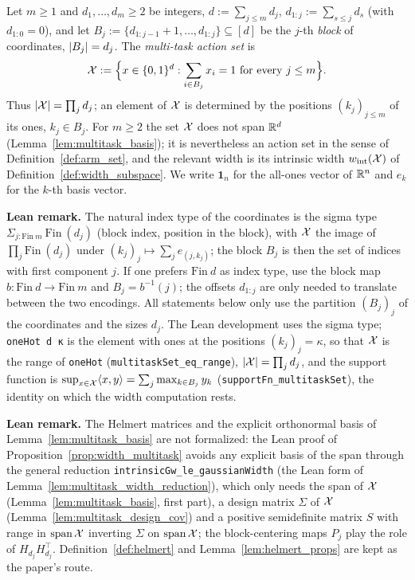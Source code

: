\begin{definition}\label{def:multitask_set}
\leanok
{}
Let $m \ge 1$ and $d_1,\dots,d_m \ge 2$ be integers, $d := \sum_{j\le m} d_j$,
$d_{1:j} := \sum_{s\le j}d_s$ (with $d_{1:0} = 0$), and let
$B_j := \{d_{1:j-1}+1, \dots, d_{1:j}\} \subseteq [d]$ be the $j$-th \emph{block} of
coordinates, $\lvert B_j \rvert = d_j$. The \emph{multi-task action set} is
\[
  \mathcal{X} := \Big\{x \in \{0,1\}^d : \sum_{i\in B_j}x_i = 1 \text{ for every } j \le m\Big\}.
\]
Thus $\lvert \mathcal{X} \rvert = \prod_j d_j$; an element of $\mathcal{X}$ is determined by the positions
$(k_j)_{j\le m}$ of its ones, $k_j \in B_j$. For $m \ge 2$ the set $\mathcal{X}$ does not span $\mathbb{R}^d$
(Lemma~\ref{lem:multitask_basis}); it is nevertheless an action set in the sense of
Definition~\ref{def:arm_set}, and the relevant width is its intrinsic width
$w_{\mathrm{int}}(\mathcal{X})$ of Definition~\ref{def:width_subspace}.
We write $\mathbf 1_n$ for the all-ones vector of $\mathbb{R}^n$ and $e_k$ for the $k$-th basis vector.
\end{definition}

\textbf{Lean remark.} The natural index type of the coordinates is the sigma type
$\Sigma_{j : \mathrm{Fin}\ m}\ \mathrm{Fin}\ (d_j)$ (block index, position in the block), with
$\mathcal{X}$ the image of $\prod_{j}\mathrm{Fin}\ (d_j)$ under
$(k_j)_j \mapsto \sum_j e_{(j,k_j)}$; the block $B_j$ is then the set of indices with first
component $j$. If one prefers $\mathrm{Fin}\ d$ as index type, use the block map
$b : \mathrm{Fin}\ d \to \mathrm{Fin}\ m$ and $B_j = b^{-1}(j)$; the offsets $d_{1:j}$ are
only needed to translate between the two encodings. All statements below only use the
partition $(B_j)_j$ of the coordinates and the sizes $d_j$. The Lean development uses the sigma
type; \texttt{oneHot d κ} is the element with ones at the positions $(k_j)_j = \kappa$, so that
$\mathcal{X}$ is the range of \texttt{oneHot} (\texttt{multitaskSet\_eq\_range}), $\lvert \mathcal{X} \rvert = \prod_j d_j$,
and the support function is $\sup_{x\in\mathcal{X}}\langle x, y \rangle = \sum_j\max_{k\in B_j}y_k$
(\texttt{supportFn\_multitaskSet}), the identity on which the width computation rests.

\textbf{Lean remark.} The Helmert matrices and the explicit orthonormal basis of
Lemma~\ref{lem:multitask_basis} are not formalized: the Lean proof of
Proposition~\ref{prop:width_multitask} avoids any explicit basis of the span through the
general reduction \texttt{intrinsicGw\_le\_gaussianWidth} (the Lean form of
Lemma~\ref{lem:multitask_width_reduction}), which only needs the span of $\mathcal{X}$
(Lemma~\ref{lem:multitask_basis}, first part), a design matrix $\Sigma$ of $\mathcal{X}$
(Lemma~\ref{lem:multitask_design_cov}) and a positive semidefinite matrix $S$ with range in
$\operatorname{span}\mathcal{X}$ inverting $\Sigma$ on $\operatorname{span}\mathcal{X}$; the block-centering maps $P_j$ play the role
of $H_{d_j}H_{d_j}^\top$. Definition~\ref{def:helmert} and Lemma~\ref{lem:helmert_props} are
kept as the paper's route.

